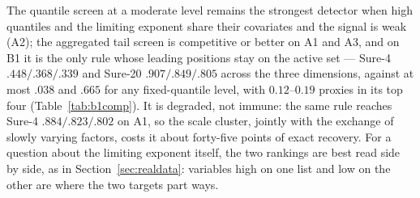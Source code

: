 The quantile screen at a moderate level remains the strongest detector
when high quantiles and the limiting exponent share their covariates
and the signal is weak (A2); the aggregated tail screen is competitive
or better on A1 and A3, and on B1 it is the only rule whose leading
positions stay on the active set --- Sure-4 $.448/.368/.339$ and
Sure-20 $.907/.849/.805$ across the three dimensions, against at most
$.038$ and $.665$ for any fixed-quantile level, with $0.12$--$0.19$
proxies in its top four (Table~\ref{tab:b1comp}). It is degraded, not
immune: the same rule reaches Sure-4 $.884/.823/.802$ on A1, so the
scale cluster, jointly with the exchange of slowly varying factors,
costs it about forty-five points of exact recovery. For a question
about the limiting exponent itself, the two rankings are best read
side by side, as in Section~\ref{sec:realdata}: variables high on one
list and low on the other are where the two targets part ways.
